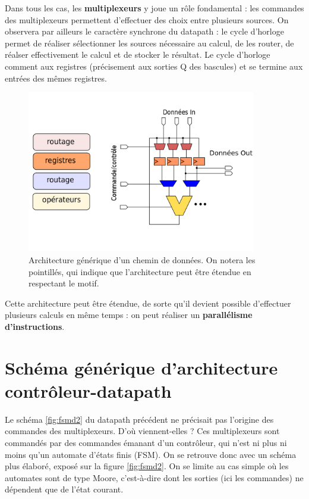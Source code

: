 Dans tous les cas, les {\bf multiplexeurs} y joue un rôle fondamental : les commandes des multiplexeurs permettent d'effectuer des choix entre plusieurs sources.
On observera par ailleurs le caractère synchrone du datapath : le cycle d'horloge permet de réaliser sélectionner les sources nécessaire au calcul, de les router,
de réalser effectivement le calcul et de stocker le résultat. Le cycle d'horloge comment aux registres (précisement aux sorties Q des bascules) et se termine aux entrées
des mêmes registres.

\begin{figure}[h!]
  \centering
   \includegraphics[width=10cm]{./figures/FSMD-1.png}
  \caption{Architecture générique d'un chemin de données. On notera les pointillés, qui indique que l'architecture peut être étendue en respectant le motif.}
  \label{fig:fsmd1}
\end{figure}

Cette architecture peut être étendue, de sorte qu'il devient possible d'effectuer plusieurs calculs en même temps : on peut réaliser un {\bf parallélisme d'instructions}.

\section{Schéma générique d'architecture contrôleur-datapath}

Le schéma \ref{fig:fsmd2} du datapath précédent ne précisait pas l'origine des commandes des multiplexeurs. D'où viennent-elles ?
Ces multiplexeurs sont commandés par des commandes émanant d'un contrôleur, qui n'est ni plus ni moins qu'un automate d'états finis (FSM).
On se retrouve donc avec un schéma plus élaboré, exposé sur la figure \ref{fig:fsmd2}. On se limite au cas simple où les automates sont de type Moore, c'est-à-dire
dont les sorties (ici les commandes) ne dépendent que de l'état courant.

